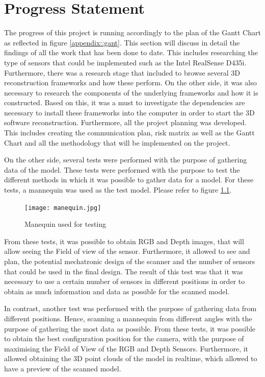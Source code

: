 \documentclass[12pt]{report}
\begin{document}
\chapter{Progress Statement}
The progress of this project is running accordingly to the plan of the Gantt Chart as reflected in figure \ref{appendix::gant}.
This section will discuss in detail the findings of all the work that has been done to date.
This includes researching the type of sensors that could be implemented such as the Intel RealSense D435i. 
Furthermore, there was a research stage that included to browse several 3D reconstruction frameworks and how these perform. 
On the other side, it was also necessary to research the components of the underlying frameworks and how it is constructed. Based on this, it was a must to investigate the dependencies 
are necessary to install these frameworks into the computer in order to start the 3D software reconstruction. 
Furthermore, all the project planning was developed. This includes creating the communication plan, risk matrix as well as the Gantt Chart and all the methodology that will be implemented on the project. 

On the other side, several tests were performed with the purpose of gathering data of the model. These tests were performed with the purpose to test the different methods in which it was possible to gather data for a model.
For these tests, a mannequin was used as the test model. Please refer to figure \ref{fig:mane}.

\begin{figure}[ht]
  \centering
  \texttt{[image: manequin.jpg]}
  \caption{Manequin used for testing}
  \label{fig:mane}
\end{figure}


From these tests, it was possible to obtain RGB and Depth images, that will allow seeing the Field of view of the sensor. Furthermore, it allowed to see and plan, the potential mechatronic design of the scanner and the number of sensors that could be used in the final design.
The result of this test was that it was necessary to use a certain number of sensors in different positions in order to obtain as much information and data as possible for the scanned model. 

In contrast, another test was performed with the purpose of gathering data from different positions. Hence, scanning a mannequin from different angles with the purpose of gathering the most data as possible. 
From these tests, it was possible to obtain the best configuration position for the camera, with the purpose of maximising the Field of View of the RGB and Depth Sensors.
Furthermore, it allowed obtaining the 3D point clouds of the model in realtime, which allowed to have a preview of the scanned model.  
\end{document}
